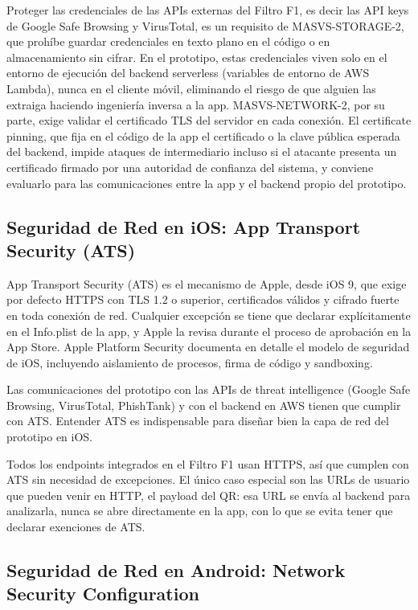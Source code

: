 Proteger las credenciales de las APIs externas del Filtro F1, es decir las API keys de Google Safe Browsing y VirusTotal, es un requisito de MASVS-STORAGE-2, que proh\'ibe guardar credenciales en texto plano en el c\'odigo o en almacenamiento sin cifrar. En el prototipo, estas credenciales viven solo en el entorno de ejecuci\'on del backend serverless (variables de entorno de AWS Lambda), nunca en el cliente m\'ovil, eliminando el riesgo de que alguien las extraiga haciendo ingenier\'ia inversa a la app. MASVS-NETWORK-2, por su parte, exige validar el certificado TLS del servidor en cada conexi\'on. El certificate pinning, que fija en el c\'odigo de la app el certificado o la clave p\'ublica esperada del backend, impide ataques de intermediario incluso si el atacante presenta un certificado firmado por una autoridad de confianza del sistema, y conviene evaluarlo para las comunicaciones entre la app y el backend propio del prototipo.

\subsection{Seguridad de Red en iOS: App Transport Security (ATS)}

App Transport Security (ATS) \cite{apple_ats} es el mecanismo de Apple, desde iOS 9, que exige por defecto HTTPS con TLS 1.2 o superior, certificados v\'alidos y cifrado fuerte en toda conexi\'on de red. Cualquier excepci\'on se tiene que declarar expl\'icitamente en el Info.plist de la app, y Apple la revisa durante el proceso de aprobaci\'on en la App Store. Apple Platform Security \cite{apple2024platformsecurity} documenta en detalle el modelo de seguridad de iOS, incluyendo aislamiento de procesos, firma de c\'odigo y sandboxing.

Las comunicaciones del prototipo con las APIs de threat intelligence (Google Safe Browsing, VirusTotal, PhishTank) y con el backend en AWS tienen que cumplir con ATS. Entender ATS es indispensable para dise\~nar bien la capa de red del prototipo en iOS.

Todos los endpoints integrados en el Filtro F1 usan HTTPS, as\'i que cumplen con ATS sin necesidad de excepciones. El \'unico caso especial son las URLs de usuario que pueden venir en HTTP, el payload del QR: esa URL se env\'ia al backend para analizarla, nunca se abre directamente en la app, con lo que se evita tener que declarar exenciones de ATS.

\subsection{Seguridad de Red en Android: Network Security Configuration}

